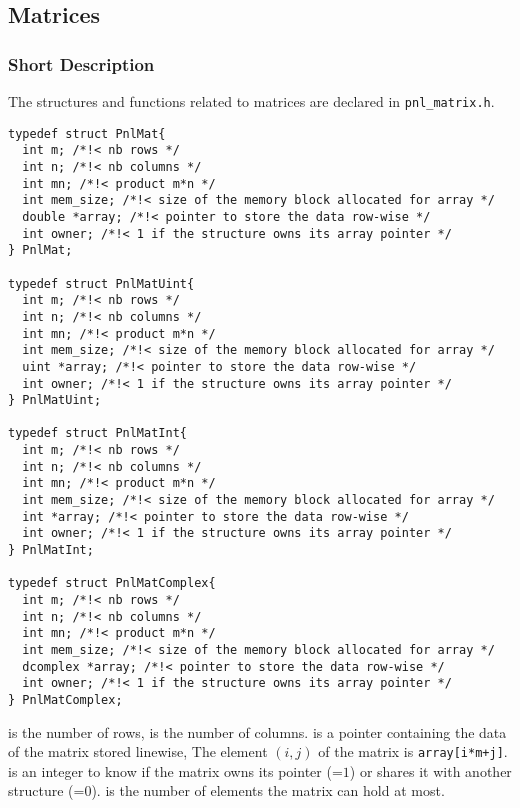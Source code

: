 
\subsection{Matrices}
\subsubsection{Short Description}

The structures and functions related to matrices are declared in
\verb!pnl_matrix.h!.

\begin{verbatim}
typedef struct PnlMat{
  int m; /*!< nb rows */ 
  int n; /*!< nb columns */ 
  int mn; /*!< product m*n */
  int mem_size; /*!< size of the memory block allocated for array */
  double *array; /*!< pointer to store the data row-wise */
  int owner; /*!< 1 if the structure owns its array pointer */
} PnlMat;

typedef struct PnlMatUint{
  int m; /*!< nb rows */ 
  int n; /*!< nb columns */ 
  int mn; /*!< product m*n */
  int mem_size; /*!< size of the memory block allocated for array */
  uint *array; /*!< pointer to store the data row-wise */
  int owner; /*!< 1 if the structure owns its array pointer */
} PnlMatUint;

typedef struct PnlMatInt{
  int m; /*!< nb rows */ 
  int n; /*!< nb columns */ 
  int mn; /*!< product m*n */
  int mem_size; /*!< size of the memory block allocated for array */
  int *array; /*!< pointer to store the data row-wise */
  int owner; /*!< 1 if the structure owns its array pointer */
} PnlMatInt;

typedef struct PnlMatComplex{
  int m; /*!< nb rows */ 
  int n; /*!< nb columns */ 
  int mn; /*!< product m*n */
  int mem_size; /*!< size of the memory block allocated for array */
  dcomplex *array; /*!< pointer to store the data row-wise */
  int owner; /*!< 1 if the structure owns its array pointer */
} PnlMatComplex;
\end{verbatim}
 is the number of rows,  is the number of columns. 
is a pointer containing the data of the matrix stored linewise, The element
$(i, j)$ of the matrix is \verb!array[i*m+j]!.  is an integer to
know if the matrix owns its  pointer (=$1$) or shares it
with another structure (=$0$).  is the number of
elements the matrix can hold at most.

